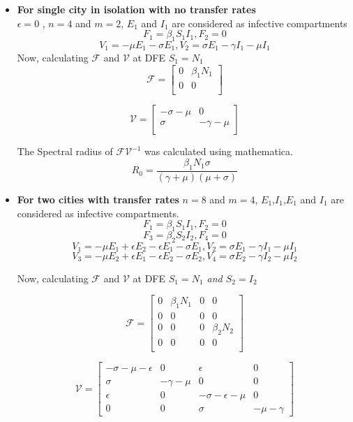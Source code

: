 \documentclass{article}
\begin{document}
\begin{itemize}
\item \textbf{For single city in isolation with no transfer rates}\\
  $\epsilon = 0$ , $n=4$ and $m=2$, $E_{1}$ and $I_{1}$ are considered as infective compartments 
  $$F_{1}= \beta_{1} S_{1} I_{1}, F_{2}=0$$
  $$V_{1}= -\mu E_{1} -\sigma E_{1} , V_{2} = \sigma E_{1} -\gamma
  I_{1} -\mu I_{1}$$ Now, calculating $\mathcal{F}$ and $\mathcal{V}$
  at DFE \textit{$S_{1}=N_{1}$} \newline \center
  \[
\mathcal{F}=
  \begin{bmatrix}
    0 & \beta_{1} N_{1} \\
    0 &  0 \\
  \end{bmatrix}
\]
 
\[
\mathcal{V}=
  \begin{bmatrix}
     -\sigma -\mu & 0  \\
    \sigma & -\gamma -\mu \\
  \end{bmatrix}
\]

The Spectral radius of $\mathcal{F}\mathcal{V}^{-1}$ was calculated using mathematica.
$$R_{0}=\frac{\beta_{1} N_{1} \sigma}{(\gamma + \mu)(\mu +\sigma)}$$

\item \flushleft \textbf{For two cities with transfer rates} \newline
  $n=8$ and $m=4$, $E_{1}$,$I_{1}$,$E_{1}$ and $I_{1}$ are considered as infective compartments.
  $$F_{1}=\beta_{1} S_{1} I_{1}, F_{2}=0$$
  $$F_{3}=\beta_{2} S_{2} I_{2}, F_{4}=0$$
  $$V_{1}=-\mu E_{1}+ \epsilon E_{2} -\epsilon E_{1} -\sigma E_{1}, V_{2}=\sigma E_{1} -\gamma I_{1} -\mu I_{1}$$
  $$V_{3}=-\mu E_{2}+ \epsilon E_{1} -\epsilon E_{2} -\sigma E_{2}, V_{4}=\sigma E_{2} -\gamma I_{2} -\mu I_{2}$$

  Now, calculating $\mathcal{F}$ and $\mathcal{V}$ at DFE \textit{$S_{1}=N_{1}$ and $S_{2}=I_{2}$} \newline

 
 \[
\mathcal{F}=
  \begin{bmatrix}
    0 & \beta_{1} N_{1} & 0 &   0 \\
    0 &  0                & 0 &   0 \\
    0 &  0                & 0 &  \beta_{2} N_{2} \\
    0 &  0                & 0 &   0 \\
  \end{bmatrix}
\]


\[
\mathcal{V}=
  \begin{bmatrix}
     -\sigma -\mu -\epsilon  & 0 & \epsilon  & 0  \\
    \sigma & -\gamma -\mu  & 0 & 0 \\
    \epsilon & 0 & -\sigma -\epsilon -\mu & 0 \\
    0 & 0 & \sigma & -\mu -\gamma
  \end{bmatrix}
\]

\end{itemize}
\end{document}
